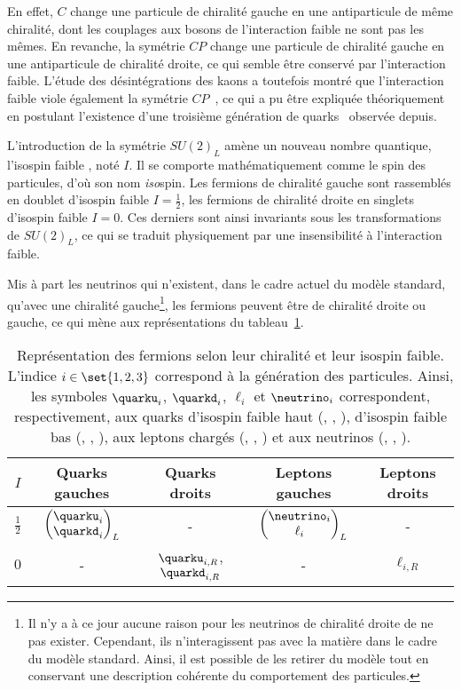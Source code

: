 En effet, $C$ change une particule de chiralité gauche en une antiparticule de même chiralité, dont les couplages aux bosons de l'interaction faible ne sont pas les mêmes.
En revanche, la symétrie $CP$ change une particule de chiralité gauche en une antiparticule de chiralité droite, ce qui semble être conservé par l'interaction faible.
L'étude des désintégrations des kaons a toutefois montré que l'interaction faible viole également la symétrie $CP$~\cite{Fitch_Cronin_CP_violation}, ce qui a pu être expliquée théoriquement en postulant l'existence d'une troisième génération de quarks~\cite{CKM_KM} observée depuis.
\par L'introduction de la symétrie $SU(2)_L$ amène un nouveau nombre quantique, l'\og isospin faible \fg, noté $I$. Il se comporte mathématiquement comme le spin des particules, d'où son nom \emph{iso}spin.
Les fermions de chiralité gauche sont rassemblés en doublet d'isospin faible $I=\frac{1}{2}$, les fermions de chiralité droite en singlets d'isospin faible $I=0$. Ces derniers sont ainsi invariants sous les transformations de $SU(2)_L$, ce qui se traduit physiquement par une insensibilité à l'interaction faible.
\par Mis à part les neutrinos qui n'existent, dans le cadre actuel du modèle standard, qu'avec une chiralité gauche\footnote{Il n'y a à ce jour aucune raison pour les neutrinos de chiralité droite de ne pas exister. Cependant, ils n'interagissent pas avec la matière dans le cadre du modèle standard. Ainsi, il est possible de les retirer du modèle tout en conservant une description cohérente du comportement des particules.}, les fermions peuvent être de chiralité droite ou gauche, ce qui mène aux représentations du tableau~\ref{tab-chapter-MS-MSSM-section-formalisme-subsec-EW-rzpt_fermions_chiralite_isospin}.
\begin{table}[h]
\centering
\begin{tabular}{ccccc}
\toprule
$I$ & Quarks gauches & Quarks droits & Leptons gauches & Leptons droits\\
\midrule
$\frac{1}{2}$ & $\displaystyle \begin{pmatrix} \quarku_i \\ \quarkd_i \end{pmatrix}_L$ & - & $\displaystyle \begin{pmatrix} \neutrino_i \\ \ell_i \end{pmatrix}_L$ & - \\
$0$ & - & $\quarku_{i,R}$, $\quarkd_{i,R}$ & - & $\ell_{i,R}$\\
\bottomrule
\end{tabular}
\caption[Représentation des fermions selon leur chiralité et leur isospin faible.]{Représentation des fermions selon leur chiralité et leur isospin faible. L'indice $i\in\set{1,2,3}$ correspond à la génération des particules. Ainsi, les symboles $\quarku_i$, $\quarkd_i$, $\ell_i$ et $\neutrino_i$ correspondent, respectivement, aux quarks d'isospin faible haut (\quarku, \quarkc, \quarkt), d'isospin faible bas (\quarkd, \quarks, \quarkb), aux leptons chargés (\ele, \mu, \tau) et aux neutrinos (\nuele, \numu, \nutau).}
\label{tab-chapter-MS-MSSM-section-formalisme-subsec-EW-rzpt_fermions_chiralite_isospin}
\end{table}
